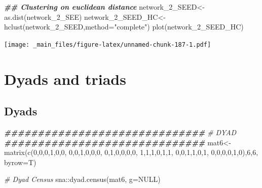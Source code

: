 \documentclass[
  notitlepage,
  onecolumn,
  openany]{book}
\newenvironment{Shaded}{\begin{snugshade}}{\end{snugshade}}
\newcommand{\AttributeTok}[1]{\textcolor[rgb]{0.77,0.63,0.00}{#1}}
\newcommand{\CommentTok}[1]{\textcolor[rgb]{0.56,0.35,0.01}{\textit{#1}}}
\newcommand{\ConstantTok}[1]{\textcolor[rgb]{0.00,0.00,0.00}{#1}}
\newcommand{\DecValTok}[1]{\textcolor[rgb]{0.00,0.00,0.81}{#1}}
\newcommand{\DocumentationTok}[1]{\textcolor[rgb]{0.56,0.35,0.01}{\textbf{\textit{#1}}}}
\newcommand{\FunctionTok}[1]{\textcolor[rgb]{0.00,0.00,0.00}{#1}}
\newcommand{\NormalTok}[1]{#1}
\newcommand{\OtherTok}[1]{\textcolor[rgb]{0.56,0.35,0.01}{#1}}
\newcommand{\SpecialCharTok}[1]{\textcolor[rgb]{0.00,0.00,0.00}{#1}}
\newcommand{\StringTok}[1]{\textcolor[rgb]{0.31,0.60,0.02}{#1}}
\begin{document}
\begin{Shaded}
\begin{Highlighting}[]
\DocumentationTok{\#\# Clustering on euclidean distance}
\NormalTok{network\_2\_SEED}\OtherTok{\textless{}{-}}\FunctionTok{as.dist}\NormalTok{(network\_2\_SEE)}
\NormalTok{network\_2\_SEED\_HC}\OtherTok{\textless{}{-}}\FunctionTok{hclust}\NormalTok{(network\_2\_SEED,}\AttributeTok{method=}\StringTok{"complete"}\NormalTok{)}
\FunctionTok{plot}\NormalTok{(network\_2\_SEED\_HC)}
\end{Highlighting}
\end{Shaded}

\texttt{[image: \_main\_files/figure-latex/unnamed-chunk-187-1.pdf]}

\hypertarget{dyads-and-triads}{%
\chapter{Dyads and triads}\label{dyads-and-triads}}

\hypertarget{dyads-1}{%
\section{Dyads}\label{dyads-1}}

\begin{Shaded}
\begin{Highlighting}[]
\DocumentationTok{\#\#\#\#\#\#\#\#\#\#\#\#\#\#\#\#\#\#\#\#\#\#\#\#\#\#\#\#\#\#}
\CommentTok{\# DYAD}
\DocumentationTok{\#\#\#\#\#\#\#\#\#\#\#\#\#\#\#\#\#\#\#\#\#\#\#\#\#\#\#\#\#\#}
\NormalTok{mat6}\OtherTok{\textless{}{-}}\FunctionTok{matrix}\NormalTok{(}\FunctionTok{c}\NormalTok{(}\DecValTok{0}\NormalTok{,}\DecValTok{0}\NormalTok{,}\DecValTok{0}\NormalTok{,}\DecValTok{1}\NormalTok{,}\DecValTok{0}\NormalTok{,}\DecValTok{0}\NormalTok{,}
               \DecValTok{0}\NormalTok{,}\DecValTok{0}\NormalTok{,}\DecValTok{1}\NormalTok{,}\DecValTok{0}\NormalTok{,}\DecValTok{0}\NormalTok{,}\DecValTok{0}\NormalTok{,}
               \DecValTok{0}\NormalTok{,}\DecValTok{1}\NormalTok{,}\DecValTok{0}\NormalTok{,}\DecValTok{0}\NormalTok{,}\DecValTok{0}\NormalTok{,}\DecValTok{0}\NormalTok{,}
               \DecValTok{1}\NormalTok{,}\DecValTok{1}\NormalTok{,}\DecValTok{1}\NormalTok{,}\DecValTok{0}\NormalTok{,}\DecValTok{1}\NormalTok{,}\DecValTok{1}\NormalTok{,}
               \DecValTok{0}\NormalTok{,}\DecValTok{0}\NormalTok{,}\DecValTok{1}\NormalTok{,}\DecValTok{1}\NormalTok{,}\DecValTok{0}\NormalTok{,}\DecValTok{1}\NormalTok{,}
               \DecValTok{0}\NormalTok{,}\DecValTok{0}\NormalTok{,}\DecValTok{0}\NormalTok{,}\DecValTok{0}\NormalTok{,}\DecValTok{1}\NormalTok{,}\DecValTok{0}\NormalTok{),}\DecValTok{6}\NormalTok{,}\DecValTok{6}\NormalTok{, }\AttributeTok{byrow=}\NormalTok{T)}

\CommentTok{\# Dyad Census}
\NormalTok{sna}\SpecialCharTok{::}\FunctionTok{dyad.census}\NormalTok{(mat6, }\AttributeTok{g=}\ConstantTok{NULL}\NormalTok{)}
\end{Highlighting}
\end{Shaded}
\end{document}
